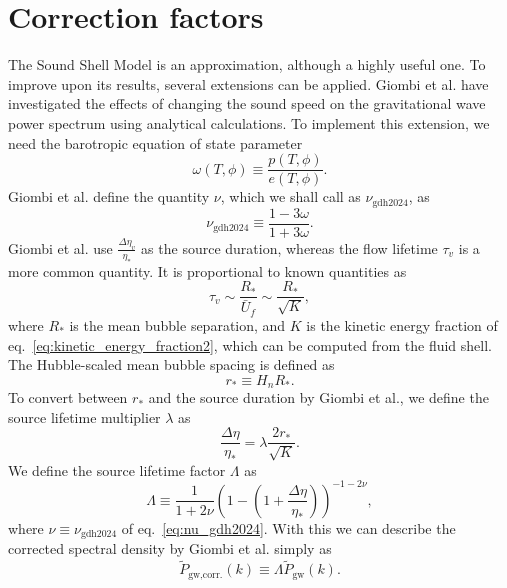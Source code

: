 \section{Correction factors}
\label{correction_factors}
The Sound Shell Model is an approximation, although a highly useful one.
To improve upon its results, several extensions can be applied.
Giombi et al. have investigated the effects of changing the sound speed on the gravitational wave power spectrum using analytical calculations.
To implement this extension, we need the barotropic equation of state parameter
\cite[p. 3]{giombi_cs_2024}
\begin{equation}
\omega(T,\phi) \equiv \frac{p(T,\phi)}{e(T,\phi)}.
\end{equation}
Giombi et al. define the quantity $\nu$, which we shall call as $\nu_\text{gdh2024}$, as
\cite[eq. 2.11]{giombi_cs_2024}
\begin{equation}
\nu_\text{gdh2024} \equiv \frac{1 - 3\omega}{1 + 3\omega}.
\label{eq:nu_gdh2024}
\end{equation}
Giombi et al. use $\frac{\Delta \eta_v}{\eta_*}$ as the source duration,
whereas the flow lifetime $\tau_v$ is a more common quantity.
It is proportional to known quantities as
\cites[p. 3]{hindmarsh_gw_pt_2019}[p. 6]{gowling_lisa_2021}
\begin{equation}
\tau_v \sim \frac{R_*}{\bar{U}_f} \sim \frac{R_*}{\sqrt{K}},
\end{equation}
where $R_*$ is the mean bubble separation, and
$K$ is the kinetic energy fraction of eq.~\eqref{eq:kinetic_energy_fraction2},
which can be computed from the fluid shell.
The Hubble-scaled mean bubble spacing is defined as
\cite[eq. 2.2]{gowling_lisa_2021}
\begin{equation}
r_* \equiv H_n R_*.
\end{equation}
To convert between $r_*$ and the source duration by Giombi et al.,
we define the source lifetime multiplier $\lambda$ as
\begin{equation}
\frac{\Delta \eta}{\eta_*} = \lambda \frac{2 r_*}{\sqrt{K}}.
\end{equation}
We define the source lifetime factor $\Lambda$ as
\cite[eq. 3.13]{giombi_cs_2024}
\begin{equation}
\Lambda \equiv \frac{1}{1 + 2\nu} \left(1 - \left(1 + \frac{\Delta \eta}{\eta_*} \right) \right)^{-1-2\nu},
\end{equation}
where $\nu \equiv \nu_\text{gdh2024}$ of eq.~\eqref{eq:nu_gdh2024}.
With this we can describe the corrected spectral density by Giombi et al. simply as
\begin{equation}
\tilde{P}_\text{gw,corr.}(k)
\equiv \Lambda \tilde{P}_\text{gw}(k).
\end{equation}

